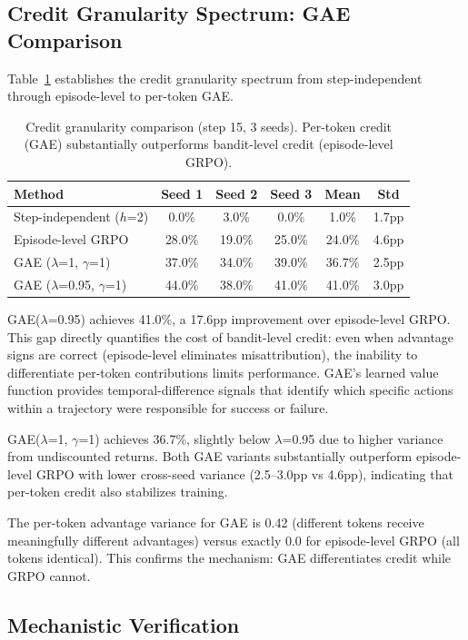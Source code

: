 \documentclass{article}
\begin{document}
\subsection{Credit Granularity Spectrum: GAE Comparison}

Table~\ref{tab:gae} establishes the credit granularity spectrum from step-independent through episode-level to per-token GAE.

\begin{table}[h]
\centering
\caption{Credit granularity comparison (step 15, 3 seeds). Per-token credit (GAE) substantially outperforms bandit-level credit (episode-level GRPO).}
\label{tab:gae}
\begin{tabular}{lccccc}
\toprule
Method & Seed 1 & Seed 2 & Seed 3 & Mean & Std \\
\midrule
Step-independent ($h$=2) & 0.0\% & 3.0\% & 0.0\% & 1.0\% & 1.7pp \\
Episode-level GRPO & 28.0\% & 19.0\% & 25.0\% & 24.0\% & 4.6pp \\
GAE ($\lambda$=1, $\gamma$=1) & 37.0\% & 34.0\% & 39.0\% & 36.7\% & 2.5pp \\
GAE ($\lambda$=0.95, $\gamma$=1) & 44.0\% & 38.0\% & 41.0\% & 41.0\% & 3.0pp \\
\bottomrule
\end{tabular}
\end{table}

GAE($\lambda$=0.95) achieves 41.0\%, a 17.6pp improvement over episode-level GRPO. This gap directly quantifies the cost of bandit-level credit: even when advantage signs are correct (episode-level eliminates misattribution), the inability to differentiate per-token contributions limits performance. GAE's learned value function provides temporal-difference signals that identify which specific actions within a trajectory were responsible for success or failure.

GAE($\lambda$=1, $\gamma$=1) achieves 36.7\%, slightly below $\lambda$=0.95 due to higher variance from undiscounted returns. Both GAE variants substantially outperform episode-level GRPO with lower cross-seed variance (2.5--3.0pp vs 4.6pp), indicating that per-token credit also stabilizes training.

The per-token advantage variance for GAE is 0.42 (different tokens receive meaningfully different advantages) versus exactly 0.0 for episode-level GRPO (all tokens identical). This confirms the mechanism: GAE differentiates credit while GRPO cannot.

\subsection{Mechanistic Verification}
\label{sec:mechanism}
\end{document}
